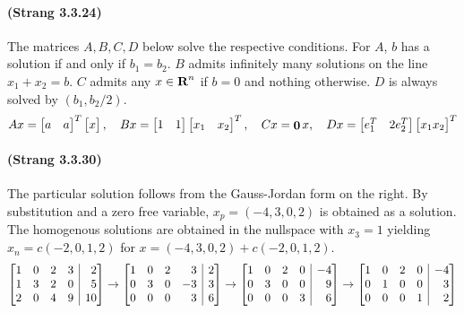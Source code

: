 \documentclass[10pt]{article}
\makeatletter
\newenvironment{sysmatrix}[1]
 {\left[\begin{array}{@{}#1@{}}}
 {\end{array}\right]}
\newcommand{\reals}{{\mbox{\bf R}}}
\newcommand{\zero}{\mathop{\bf 0}}
\makeatother
\begin{document}
\paragraph{(Strang 3.3.24)}
The matrices $A,B,C,D$ below solve the respective conditions. For $A$, $b$ has a solution if and only if $b_1=b_2$. $B$ admits infinitely many solutions on the line $x_1 + x_2 = b$. $C$ admits any $x\in\reals^n$ if $b=0$ and nothing otherwise. $D$ is always solved by $(b_1, b_2/2)$.
\[Ax=\begin{bmatrix}a& a\end{bmatrix}^T\begin{bmatrix}x\end{bmatrix},\quad
Bx= \begin{bmatrix}1& 1\end{bmatrix}\begin{bmatrix}x_1&x_2\end{bmatrix}^T,\quad
Cx=\zero x,\quad 
Dx= \begin{bmatrix}e_{1}^{T}& 2e_{2}^{T}\end{bmatrix}\begin{bmatrix}x_1 x_2\end{bmatrix}^{T}
\]


\paragraph{(Strang 3.3.30)} The particular solution follows from the Gauss-Jordan form on the right. By substitution and a zero free variable, $x_p = (-4,3,0,2)$ is obtained as a solution. The homogenous solutions are obtained in the nullspace with $x_3=1$ yielding $x_n = c(-2,0,1,2)$ for $x = (-4,3,0,2)+c(-2,0,1,2)$. 
\[
\begin{sysmatrix}{rrrr|r}
1& 0& 2& 3& 2\\
1& 3& 2& 0& 5\\
2& 0& 4& 9& 10
\end{sysmatrix}\rightarrow
\begin{sysmatrix}{rrrr|r}
1& 0& 2& 3& 2\\
0& 3& 0& -3& 3\\
0& 0& 0& 3& 6
\end{sysmatrix}\rightarrow
\begin{sysmatrix}{rrrr|r}
1& 0& 2& 0& -4\\
0& 3& 0& 0& 9\\
0& 0& 0& 3& 6
\end{sysmatrix}\rightarrow
\begin{sysmatrix}{rrrr|r}
1& 0& 2& 0& -4\\
0& 1& 0& 0& 3\\
0& 0& 0& 1& 2
\end{sysmatrix}
\]
\end{document}
